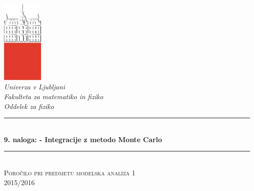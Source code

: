 \documentclass[slovene,11pt,a4paper]{article}
\numberwithin{equation}{section} %
\numberwithin{figure}{section} %
\numberwithin{table}{section} %
\begin{document}
\begin{titlepage}

\newcommand{\HRule}{\rule{\linewidth}{0.5mm}} %

\center %


 

\includegraphics[width=2cm]{slike/aaa}\\[0.5cm]
 
\textit{Univerza v Ljubljani}\\
\textit{Fakulteta za {\color{red}matematiko in fiziko}}\\[0.5cm]

\emph{Oddelek za fiziko}\\[0.5cm] %


\HRule \\[0.4cm]
\huge {\bfseries 9. naloga: - Integracije z metodo Monte Carlo}\\[0.4cm] %
\HRule \\[0.5cm] 

 \textsc{\large Poročilo pri predmetu modelska analiza 1}\\
 \textsc{\large 2015/2016}\\[1cm] %
 

\end{titlepage}
\end{document}
